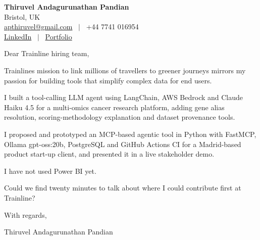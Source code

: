 \documentclass[11pt,a4paper]{article}
\begin{document}
\raggedright
\pagestyle{empty}

\begin{center}
    {\LARGE \color{linkblue} \textbf{Thiruvel Andagurunathan Pandian}}\\[0.2cm]
    Bristol, UK \\
    \href{mailto:apthiruvel@gmail.com}{apthiruvel@gmail.com} \ $|$ \ +44 7741 016954 \\
\href{https://www.linkedin.com/in/thiruvel-a-p/}{LinkedIn} \ $|$ \ \href{https://thiruvel-ap.github.io/PersonalPortfolio/}{Portfolio}
\end{center}

\vspace{0.4cm}

\noindent
Dear Trainline hiring team,

Trainline\textquotesingle{}s mission to link millions of travellers to greener journeys mirrors my passion for building tools that simplify complex data for end users.

I built a tool-calling LLM agent using LangChain, AWS Bedrock and Claude Haiku 4.5 for a multi-omics cancer research platform, adding gene alias resolution, scoring-methodology explanation and dataset provenance tools.

I proposed and prototyped an MCP-based agentic tool in Python with FastMCP, Ollama gpt-oss:20b, PostgreSQL and GitHub Actions CI for a Madrid-based product start-up client, and presented it in a live stakeholder demo.

I have not used Power BI yet.

Could we find twenty minutes to talk about where I could contribute first at Trainline?

\vspace{0.5cm}

With regards,

Thiruvel Andagurunathan Pandian
\end{document}
